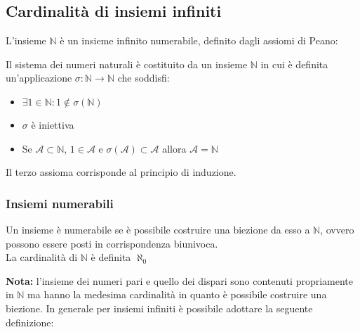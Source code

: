 \documentclass[10pt]{article}
\theoremstyle{plain}
\begin{document}
\subsection{Cardinalità di insiemi infiniti}
L'insieme $\mathbb{N}$ è un insieme infinito numerabile, definito dagli assiomi di Peano:
\begin{defin}
    Il sistema dei numeri naturali è costituito da un insieme $\mathbb{N}$ in cui è definita un'applicazione $\sigma : \mathbb{N} \rightarrow \mathbb{N}$ che soddisfi:
    \begin{itemize}
        \item $\exists 1 \in \mathbb{N} : 1 \notin \sigma (\mathbb{N})$
        \item $\sigma$ è iniettiva
        \item Se $\mathcal{A} \subset \mathbb{N}$, $1 \in \mathcal{A}$ e $\sigma(\mathcal{A}) \subset \mathcal{A}$ allora $\mathcal{A} = \mathbb{N}$
    \end{itemize}
    Il terzo assioma corrisponde al principio di induzione.
\end{defin}
\subsubsection*{Insiemi numerabili}
\begin{defin}
    Un insieme è numerabile se è possibile costruire una biezione da esso a $\mathbb{N}$, ovvero possono essere posti in corrispondenza biunivoca.
    \\La cardinalità di $\mathbb{N}$ è definita $\aleph_0$
\end{defin}
\textbf{Nota: } l'insieme dei numeri pari e quello dei dispari sono contenuti propriamente in $\mathbb{N}$ ma hanno la medesima cardinalità in quanto è possibile costruire una biezione. In generale per insiemi infiniti è possibile adottare la seguente definizione:
\end{document}
